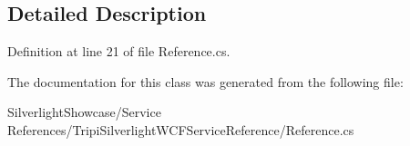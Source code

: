\subsection{Detailed Description}


Definition at line 21 of file Reference.cs.

The documentation for this class was generated from the following file:\begin{DoxyCompactItemize}
\item 
SilverlightShowcase/Service References/TripiSilverlightWCFServiceReference/Reference.cs\end{DoxyCompactItemize}
